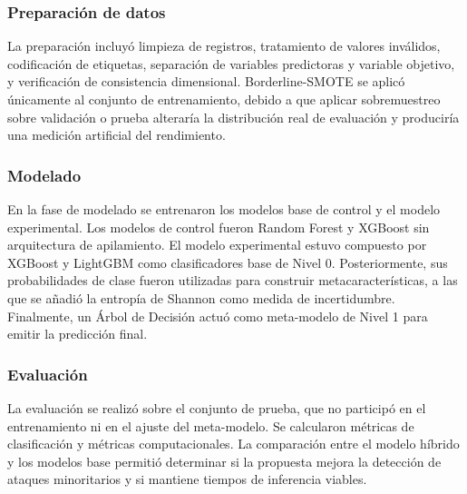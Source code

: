 \documentclass[12pt,a4paper]{article}
\begin{document}
\subsubsection{Preparación de datos}

La preparación incluyó limpieza de registros, tratamiento de valores inválidos, codificación de etiquetas, separación de variables predictoras y variable objetivo, y verificación de consistencia dimensional. Borderline-SMOTE se aplicó únicamente al conjunto de entrenamiento, debido a que aplicar sobremuestreo sobre validación o prueba alteraría la distribución real de evaluación y produciría una medición artificial del rendimiento.

\subsubsection{Modelado}

En la fase de modelado se entrenaron los modelos base de control y el modelo experimental. Los modelos de control fueron Random Forest y XGBoost sin arquitectura de apilamiento. El modelo experimental estuvo compuesto por XGBoost y LightGBM como clasificadores base de Nivel 0. Posteriormente, sus probabilidades de clase fueron utilizadas para construir metacaracterísticas, a las que se añadió la entropía de Shannon como medida de incertidumbre. Finalmente, un Árbol de Decisión actuó como meta-modelo de Nivel 1 para emitir la predicción final.

\subsubsection{Evaluación}

La evaluación se realizó sobre el conjunto de prueba, que no participó en el entrenamiento ni en el ajuste del meta-modelo. Se calcularon métricas de clasificación y métricas computacionales. La comparación entre el modelo híbrido y los modelos base permitió determinar si la propuesta mejora la detección de ataques minoritarios y si mantiene tiempos de inferencia viables.
\end{document}
